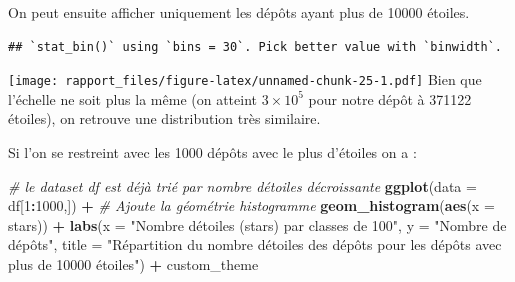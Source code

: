 \documentclass[
]{article}
\newenvironment{Shaded}{\begin{snugshade}}{\end{snugshade}}
\newcommand{\AttributeTok}[1]{\textcolor[rgb]{0.13,0.29,0.53}{#1}}
\newcommand{\CommentTok}[1]{\textcolor[rgb]{0.56,0.35,0.01}{\textit{#1}}}
\newcommand{\DecValTok}[1]{\textcolor[rgb]{0.00,0.00,0.81}{#1}}
\newcommand{\FunctionTok}[1]{\textcolor[rgb]{0.13,0.29,0.53}{\textbf{#1}}}
\newcommand{\NormalTok}[1]{#1}
\newcommand{\SpecialCharTok}[1]{\textcolor[rgb]{0.81,0.36,0.00}{\textbf{#1}}}
\newcommand{\StringTok}[1]{\textcolor[rgb]{0.31,0.60,0.02}{#1}}
\begin{document}
On peut ensuite afficher uniquement les dépôts ayant plus de 10000
étoiles.

\begin{Shaded}
\end{Shaded}

\begin{verbatim}
## `stat_bin()` using `bins = 30`. Pick better value with `binwidth`.
\end{verbatim}

\texttt{[image: rapport\_files/figure-latex/unnamed-chunk-25-1.pdf]} Bien
que l'échelle ne soit plus la même (on atteint \(3\times 10^5\) pour
notre dépôt à 371122 étoiles), on retrouve une distribution très
similaire.

Si l'on se restreint avec les 1000 dépôts avec le plus d'étoiles on a :

\begin{Shaded}
\begin{Highlighting}[]
\CommentTok{\# le dataset df est déjà trié par nombre d\textquotesingle{}étoiles décroissante}
\FunctionTok{ggplot}\NormalTok{(}\AttributeTok{data =}\NormalTok{ df[}\DecValTok{1}\SpecialCharTok{:}\DecValTok{1000}\NormalTok{,]) }\SpecialCharTok{+}
    \CommentTok{\# Ajoute la géométrie histogramme}
    \FunctionTok{geom\_histogram}\NormalTok{(}\FunctionTok{aes}\NormalTok{(}\AttributeTok{x =}\NormalTok{ stars)) }\SpecialCharTok{+} 
    \FunctionTok{labs}\NormalTok{(}\AttributeTok{x =} \StringTok{"Nombre d\textquotesingle{}étoiles (\textquotesingle{}stars\textquotesingle{}) par classes de 100"}\NormalTok{,}
         \AttributeTok{y =} \StringTok{"Nombre de dépôts"}\NormalTok{,}
         \AttributeTok{title =} \StringTok{"Répartition du nombre d\textquotesingle{}étoiles des dépôts}
\StringTok{         pour les dépôts avec plus de 10000 étoiles"}\NormalTok{) }\SpecialCharTok{+}
\NormalTok{  custom\_theme}
\end{Highlighting}
\end{Shaded}
\end{document}
